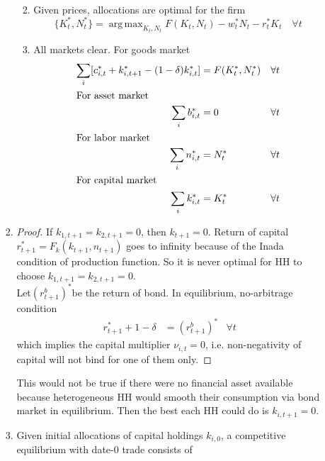 \documentclass{article}
\DeclareMathOperator*{\argmax}{arg\,max}
\begin{document}
\begin{enumerate}
\begin{enumerate}
\begin{enumerate}
\begin{enumerate}[label=\arabic*)]
\begin{align*}
                    \end{align*}
                    \item Given prices, allocations are optimal for the firm
                    \[\{K_{t}^\ast,N_{t}^\ast\}=\argmax_{K_{t},N_{t}}F(K_{t},N_{t})-w_{t}^\ast N_{t}-r_t^\ast K_{t}\quad\forall t\]
                    \item All markets clear. For goods market 
                    \begin{align*}
                        \sum_i[c_{i,t}^\ast+k_{i,t+1}^\ast-(1-\delta)k_{i,t}^\ast]&=F(K_{t}^\ast,N_{t}^\ast)&\forall t\\
                        \intertext{For asset market}
                        \sum_ib_{i,t}^\ast&=0&\forall t\\
                        \intertext{For labor market}
                        \sum_in_{i,t}^\ast&=N_{t}^\ast&\forall t\\
                        \intertext{For capital market}
                        \sum_ik_{i,t}^\ast&=K_{t}^\ast&\forall t
                    \end{align*}
                \end{enumerate}
                \item 
                \begin{proof}
                    If \(k_{1,t+1}=k_{2,t+1}=0\), then \(k_{t+1}=0\). Return of capital \(r_{t+1}^\ast=F_k(k_{t+1},n_{t+1})\) goes to infinity because of the Inada condition of production function.
                    So it is never optimal for HH to choose \(k_{1,t+1}=k_{2,t+1}=0\).\\
                Let\((r_{t+1}^b)^\ast\)be the return of bond. In equilibrium, no-arbitrage condition
                \begin{align*}
                    r_{t+1}^\ast+1-\delta&=(r_{t+1}^b)^\ast&\forall t
                \end{align*}
                which implies the capital multiplier \(\nu_{i,t}=0\), i.e. non-negativity of capital will not bind for one of them only.
                \end{proof}
                This would not be true if there were no financial asset available because heterogeneous HH would smooth their consumption via bond market in equilibrium.
                Then the best each HH could do is \(k_{i,t+1}=0\).
                \item Given initial allocations of capital holdings $k_{i,0}$, a competitive equilibrium with date-0 trade consists of 

\end{enumerate}
\end{enumerate}
\end{enumerate}
\end{document}
